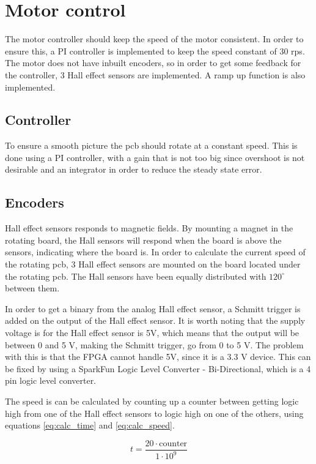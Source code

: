 \section{Motor control}
The motor controller should keep the speed of the motor consistent.
In order to ensure this, a PI controller is implemented to keep the speed constant of 30 rps.
The motor does not have inbuilt encoders, so in order to get some feedback for the controller, 3 Hall effect sensors are implemented.
A ramp up function is also implemented.

\subsection{Controller}

To ensure a smooth picture the pcb should rotate at a constant speed.
This is done using a PI controller, with a gain that is not too big since overshoot is not desirable and an integrator in order to reduce the steady state error.

\subsection{Encoders} \label{sec:encoders}

Hall effect sensors responds to magnetic fields.
By mounting a magnet in the rotating board, the Hall sensors will respond when the board is above the sensors, indicating where the board is.
In order to calculate the current speed of the rotating pcb, 3 Hall effect sensors are mounted on the board located under the rotating pcb.
The Hall sensors have been equally distributed with $120^{\circ}$ between them.

In order to get a binary from the analog Hall effect sensor, a Schmitt trigger\cite[p. 655]{book:prac_ele} is added on the output of the Hall effect sensor.
It is worth noting that the supply voltage is for the Hall effect sensor is 5V, which means that the output will be between 0 and 5 V, making the Schmitt trigger, go from 0 to 5 V.
The problem with this is that the FPGA cannot handle 5V, since it is a 3.3 V device.
This can be fixed by using a SparkFun Logic Level Converter - Bi-Directional, which is a 4 pin logic level converter. 

The speed is can be calculated by counting up a counter between getting logic high from one of the Hall effect sensors to  logic high on one of the others, using equations  \ref{eq:calc_time} and \ref{eq:calc_speed}.

\begin{equation} \label{eq:calc_time}
 t = \frac{20\cdot \text{counter}}{1\cdot 10^9}
\end{equation}


